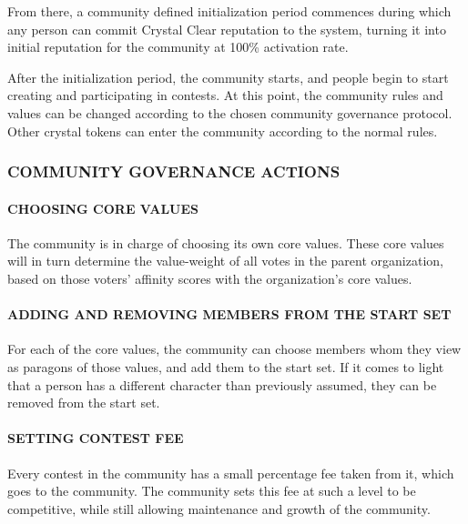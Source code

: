 From there, a community defined initialization period commences during
which any person can commit Crystal Clear reputation to the system,
turning it into initial reputation for the community at 100\% activation
rate.

After the initialization period, the community starts, and people begin
to start creating and participating in contests. At this point, the
community rules and values can be changed according to the chosen
community governance protocol. Other crystal tokens can enter the
community according to the normal rules.

\subsubsection{\texorpdfstring{\protect\hypertarget{_39dbt8io90sr}{}{\protect\hypertarget{_Toc462050430}{}{}}COMMUNITY
GOVERNANCE
ACTIONS}{COMMUNITY GOVERNANCE ACTIONS}}\label{community-governance-actions}

\paragraph{CHOOSING CORE VALUES}\label{choosing-core-values-1}

The community is in charge of choosing its own core values. These core
values will in turn determine the value-weight of all votes in the
parent organization, based on those voters' affinity scores with the
organization's core values.

\paragraph{ADDING AND REMOVING MEMBERS FROM THE START
SET}\label{adding-and-removing-members-from-the-start-set-1}

For each of the core values, the community can choose members whom they
view as paragons of those values, and add them to the start set. If it
comes to light that a person has a different character than previously
assumed, they can be removed from the start set.

\paragraph{SETTING CONTEST FEE}\label{setting-contest-fee-1}

Every contest in the community has a small percentage fee taken from it,
which goes to the community. The community sets this fee at such a level
to be competitive, while still allowing maintenance and growth of the
community.

